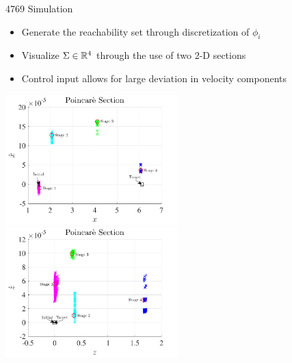 \begin{frame}{4769 Simulation}

\begin{itemize}
    \item Generate the reachability set through discretization of \( \phi_i \)
    \item Visualize \( \Sigma \in \mathbb{R}^4 \) through the use of two 2-D sections
    \pause
    \item Control input allows for large deviation in velocity components
\end{itemize}

\begin{center}
    \includegraphics[width=0.5\textwidth]{figures/2016AAS/poincare_xvsxdot.pdf}
    \hfill
    \includegraphics[width=0.5\textwidth]{figures/2016AAS/poincare_zvszdot.pdf}
\end{center}

\end{frame}

